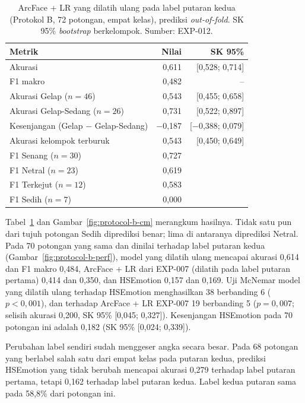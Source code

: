 \begin{table}[htbp]
\centering
\caption[Kinerja ArcFace + LR yang dilatih ulang pada label putaran kedua]{ArcFace + LR yang dilatih ulang pada label putaran kedua (Protokol B, 72 potongan, empat kelas), prediksi \textit{out-of-fold}. SK 95\% \textit{bootstrap} berkelompok. Sumber: EXP-012.}
\label{tab:protocol-b}
\small
\begin{tabular}{lrr}
\toprule
Metrik & Nilai & SK 95\% \\
\midrule
Akurasi & 0,611 & [0,528; 0,714] \\
F1 makro & 0,482 & -- \\
Akurasi Gelap ($n = 46$) & 0,543 & [0,455; 0,658] \\
Akurasi Gelap-Sedang ($n = 26$) & 0,731 & [0,522; 0,897] \\
Kesenjangan (Gelap $-$ Gelap-Sedang) & $-$0,187 & [$-$0,388; 0,079] \\
Akurasi kelompok terburuk & 0,543 & [0,450; 0,649] \\
\midrule
F1 Senang ($n = 30$) & 0,727 & \\
F1 Netral ($n = 23$) & 0,619 & \\
F1 Terkejut ($n = 12$) & 0,583 & \\
F1 Sedih ($n = 7$) & 0,000 & \\
\bottomrule
\end{tabular}
\end{table}

Tabel~\ref{tab:protocol-b} dan Gambar~\ref{fig:protocol-b-cm} merangkum hasilnya. Tidak satu pun dari tujuh potongan Sedih diprediksi benar; lima di antaranya diprediksi Netral. Pada 70 potongan yang sama dan dinilai terhadap label putaran kedua (Gambar~\ref{fig:protocol-b-perf}), model yang dilatih ulang mencapai akurasi 0,614 dan F1 makro 0,484, ArcFace + LR dari EXP-007 (dilatih pada label putaran pertama) 0,414 dan 0,350, dan HSEmotion 0,157 dan 0,169. Uji McNemar model yang dilatih ulang terhadap HSEmotion menghasilkan 38 berbanding 6 ($p < 0,001$), dan terhadap ArcFace + LR EXP-007 19 berbanding 5 ($p = 0,007$; selisih akurasi 0,200, SK 95\% [0,045; 0,327]). Kesenjangan HSEmotion pada 70 potongan ini adalah 0,182 (SK 95\% [0,024; 0,339]).

Perubahan label sendiri sudah menggeser angka secara besar. Pada 68 potongan yang berlabel salah satu dari empat kelas pada putaran kedua, prediksi HSEmotion yang tidak berubah mencapai akurasi 0,279 terhadap label putaran pertama, tetapi 0,162 terhadap label putaran kedua. Label kedua putaran sama pada 58,8\% dari potongan ini.


